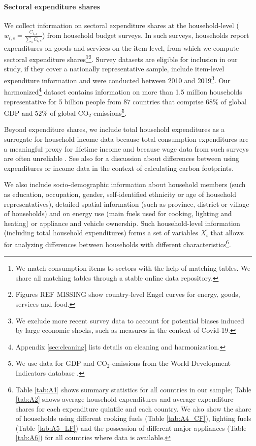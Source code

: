 \documentclass[12pt, a4paper]{article}
\begin{document}
\paragraph{Sectoral expenditure shares} We collect information on sectoral expenditure shares at the household-level ($w_{i,s}=\frac{C_{i,s}}{\sum_{s}C_{i,s}}$) from household budget surveys. In such surveys, households report expenditures on goods and services on the item-level, from which we compute sectoral expenditure shares\footnote{We match consumption items to sectors with the help of matching tables. We share all matching tables through a stable online data repository.}\footnote{Figures REF MISSING show country-level Engel curves for energy, goods, services and food.}.
Survey datasets are eligible for inclusion in our study, if they cover a nationally representative sample, include item-level expenditure information and were conducted between 2010 and 2019\footnote{We exclude more recent survey data to account for potential biases induced by large economic shocks, such as measures in the context of Covid-19.}. Our harmonized\footnote{Appendix \ref{sec:cleaning} lists details on cleaning and harmonization.} dataset contains information on more than 1.5 million households representative for 5 billion people from 87 countries that comprise 68\% of global GDP and 52\% of global CO$_{2}$-emissions\footnote{We use data for GDP and CO$_{2}$-emissions from the World Development Indicators database \autocite{WorldBankGroup.2023}.}.

Beyond expenditure shares, we include total household expenditures as a surrogate for household income data because total consumption expenditures are a meaningful proxy for lifetime income \autocite{Poterba.1989,JamesM.Poterba.2016,Cronin.2019} and because wage data from such surveys are often unreliable \autocite{Blundell.1998}. See also \textcite{Levay.2023} for a discussion about differences between using expenditures or income data in the context of calculating carbon footprints.

We also include socio-demographic information about household members (such as education, occupation, gender, self-identified ethnicity or age of household representatives), detailed spatial information (such as province, district or village of households) and on energy use (main fuels used for cooking, lighting and heating) or appliance and vehicle ownership. Such household-level information (including total household expenditures) forms a set of variables $X_{i}^{'}$ that allows for analyzing differences between households with different characteristics\footnote{Table \ref{tab:A1} shows summary statistics for all countries in our sample; Table \ref{tab:A2} shows average household expenditures and average expenditure shares for each expenditure quintile and each country. We also show the share of households using different cooking fuels (Table \ref{tab:A4_CF}), lighting fuels (Table \ref{tab:A5_LF}) and the possession of different major appliances (Table \ref{tab:A6}) for all countries where data is available.}. 
\end{document}
